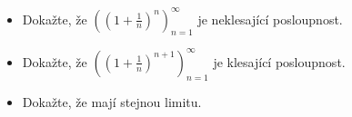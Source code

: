 \begin{itemize}
	\item  Dokažte, že $\left( (1 + \frac{1}{n})^n \right)_{n = 1}^{\infty}$ je neklesající posloupnost.
	\item  Dokažte, že $\left( (1 + \frac{1}{n})^{n+1} \right)_{n = 1}^{\infty}$ je klesající posloupnost.
	\item  Dokažte, že mají stejnou limitu.
\end{itemize}



